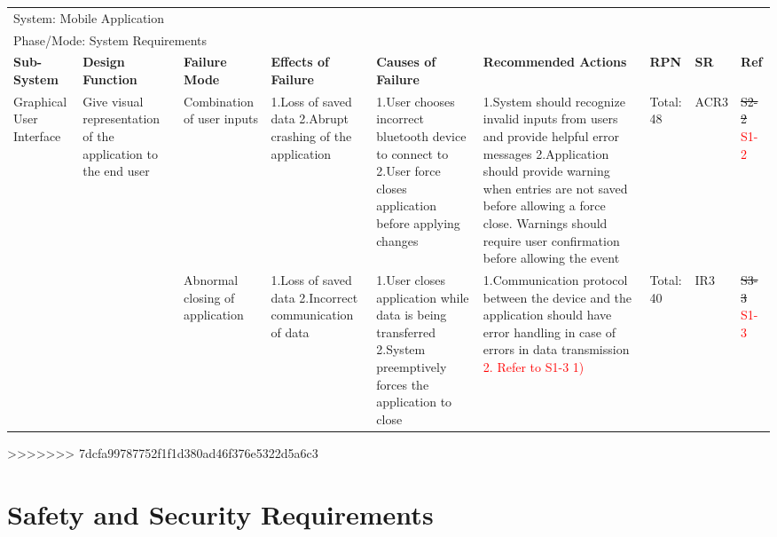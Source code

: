 \documentclass[12pt, titlepage]{article}
\begin{document}
\begin{landscape}
\begin{table}[H]
\begin{tabular}{| p{} | p{}  | p{} | p{} | p{} | p{} | p{} | p{} | p{} |}
    \multicolumn{9}{|l|}{System: Mobile Application } \\
    \multicolumn{9}{|l|}{Phase/Mode: System Requirements} \\ \hline
    \textbf{Sub-System} & \textbf{Design Function} & \textbf{Failure Mode} & \textbf{Effects of Failure} & \textbf{Causes of Failure} & \textbf{Recommended Actions} & \textbf{RPN} & \textbf{SR} & \textbf{Ref} \\ \hline

    Graphical User Interface & Give visual representation of the application to the end user & Combination of user inputs & 1.Loss of saved data \newline 2.Abrupt crashing of the application  &  1.User chooses incorrect bluetooth device to connect to \newline 2.User force closes application before applying changes  &  1.System should recognize invalid inputs from users and provide helpful error messages \newline 2.Application should provide warning when entries are not saved before allowing a force close. Warnings should require user confirmation before allowing the event  & Total: 48 & ACR3 & \sout{S2-2} \textcolor{red}{S1-2} \\ \cline{3-9}

     & & Abnormal closing of application & 1.Loss of saved data \newline 2.Incorrect communication of data  & 1.User closes application while data is being transferred \newline 2.System preemptively forces the application to close & 1.Communication protocol between the device and the application should have error handling in case of errors in data transmission \newline \textcolor{red}{2. Refer to S1-3 1)}  & Total: 40 & IR3 & \sout{S3-3} \textcolor{red}{S1-3} \\ \hline
    
    \end{tabular}
>>>>>>> 7dcfa99787752f1f1d380ad46f376e5322d5a6c3
    
\end{table}

\end{landscape}

\section{Safety and Security Requirements}
\end{document}
